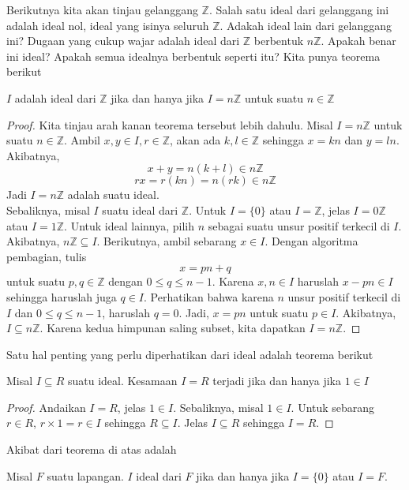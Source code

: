 	Berikutnya kita akan tinjau gelanggang $\mathbb{Z}$. Salah satu ideal dari gelanggang ini adalah ideal nol, ideal yang isinya seluruh $\mathbb{Z}$. Adakah ideal lain dari gelanggang ini?
	Dugaan yang cukup wajar adalah ideal dari $\mathbb{Z}$ berbentuk $n\mathbb{Z}$. Apakah benar ini ideal? Apakah semua idealnya berbentuk seperti itu? Kita punya teorema berikut
	
	\begin{theorem}
		$I$ adalah ideal dari $\mathbb{Z}$ jika dan hanya jika $I = n\mathbb{Z}$ untuk suatu $n \in \mathbb{Z}$
	\end{theorem}
	\begin{proof}
		Kita tinjau arah kanan teorema tersebut lebih dahulu. Misal $I = n\mathbb{Z}$ untuk suatu $n \in \mathbb{Z}$. Ambil $x,y \in I, r \in \mathbb{Z}$, akan ada $k,l \in \mathbb{Z}$ sehingga $x = kn$ dan $y = ln$. Akibatnya,
		$$x+y = n(k+l) \in n\mathbb{Z}$$
		$$rx = r(kn) = n(rk) \in n\mathbb{Z}$$
		Jadi $I = n\mathbb{Z}$ adalah suatu ideal.
		\\
		
		Sebaliknya, misal $I$ suatu ideal dari $\mathbb{Z}$. Untuk $I = \{0\}$ atau $I = \mathbb{Z}$, jelas $I = 0\mathbb{Z}$ atau $I = 1\mathbb{Z}$. Untuk ideal lainnya, pilih $n$ sebagai suatu unsur positif terkecil di $I$. Akibatnya, $n\mathbb{Z} \subseteq I$. Berikutnya, ambil sebarang $x \in I$. Dengan algoritma pembagian, tulis
		$$x = pn + q$$
		untuk suatu $p,q \in \mathbb{Z}$ dengan $0 \le q \le n-1$. Karena $x,n \in I$ haruslah $x - pn \in I$ sehingga haruslah juga $q \in I$. Perhatikan bahwa karena $n$ unsur positif terkecil di $I$ dan $0 \le q \le n-1$, haruslah $q = 0$. Jadi, $x = pn$ untuk suatu $p \in I$. Akibatnya, $I \subseteq n\mathbb{Z}$. Karena kedua himpunan saling subset, kita dapatkan $I = n\mathbb{Z}$.
	\end{proof}
	Satu hal penting yang perlu diperhatikan dari ideal adalah teorema berikut
	\begin{theorem}
		Misal $I \subseteq R$ suatu ideal. Kesamaan $I = R$ terjadi jika dan hanya jika $1 \in I$
	\end{theorem}
	\begin{proof}
		Andaikan $I = R$, jelas $1 \in I$. Sebaliknya, misal $1 \in I$. Untuk sebarang $r \in R$, $r \times 1  = r \in I$ sehingga $R \subseteq I$. Jelas $I \subseteq R$ sehingga $I = R$.
	\end{proof}
	Akibat dari teorema di atas adalah
	\begin{corollary}
		Misal $F$ suatu lapangan. $I$ ideal dari $F$ jika dan hanya jika $I = \{0 \}$ atau $I = F$.
	\end{corollary}
	\hfill
	
